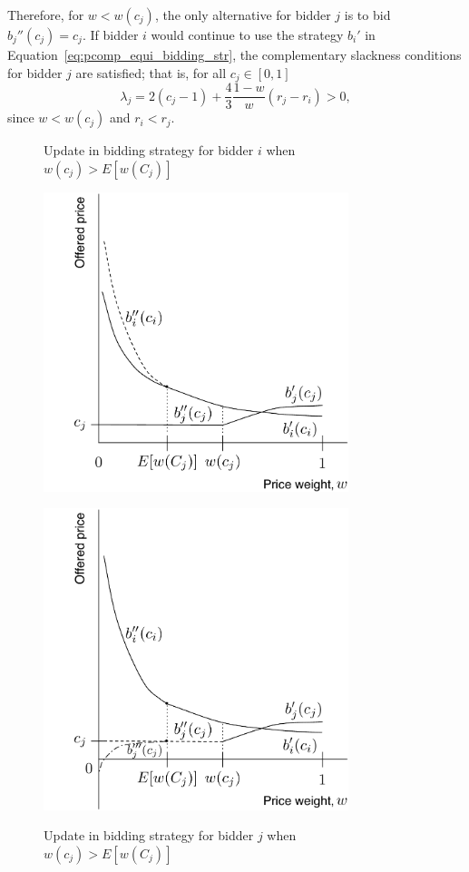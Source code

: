 Therefore, for $w < w(c_j)$, the only alternative for bidder $j$ is to bid $b_j''(c_j)=c_j$. If bidder $i$ would continue to use the strategy $b_i'$ in Equation~\eqref{eq:pcomp_equi_bidding_str}, the complementary slackness conditions for bidder $j$ are satisfied; that is, for all $c_j\in[0,1]$
\begin{equation*}
	\lambda_j = 2(c_j - 1) + \frac{4}{3}\frac{1-w}{w}(r_j-r_i)>0,
\end{equation*}
since $w < w(c_j)$ and $r_i<r_j$.
\begin{figure}[tp!]
	\caption{Update in bidding strategy for bidder $i$ when $w(c_j) > E[w(C_j)]$}
	\includegraphics[width=3.5in]{2/Figures/pincomplete_bids_update_i_1}
	\label{fig:pincomplete_bids_update_i_1}
	\caption{Update in bidding strategy for bidder $j$ when $w(c_j) > E[w(C_j)]$}
	\includegraphics[width=3.5in]{2/Figures/pincomplete_bids_update_j_1}
	\label{fig:pincomplete_bids_update_j_1}
\end{figure}

